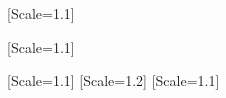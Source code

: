 
\newfontfamily{}[Scale=1.1] %

\newfontfamily{}[Scale=1.1] %

\newfontfamily{}[Scale=1.1] %
\newfontfamily{}[Scale=1.2] %
\newfontfamily{}[Scale=1.1] %


\newcommand{\mtzh}{\lmmonolightsmall \fangsong} %
\newcommand{\mtzhpr}[1]{{\mtzh #1}} %
% 
\newcommand{\mten}{\raintree}
\newcommand{\mtenpr}[1]{{\mten #1}} %


\newcommand{\rt}{\sffamily} %
\newcommand{\py}{\sffamily} %

\newcommand{\rtpr}[1]{{\rt #1}} %
\newcommand{\pypr}[1]{{\py #1}} %
\newcommand{\rcpr}[1]{\emph{#1}} %
\newcommand{\thpr}[1]{\emph{#1}} %
\newcommand{\stpr}[1]{{\itshape \CJKunderdot{#1}}} %
\newcommand{\rspr}[1]{\emph{#1}} %
\newcommand{\wrpr}[1]{{\itshape #1}} %


\usepackage{graphicx} %
\graphicspath{{image/}} %

\usepackage{float} %

\newcommand{\chapterintroimage}[1]{
\begin{figure}[H]
	\centering
	\texttt{[image: \#1]}
\end{figure}
}


